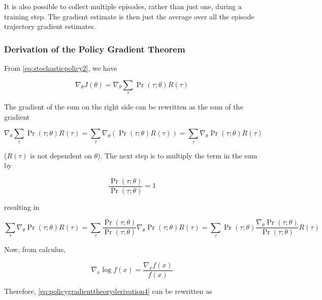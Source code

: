 \documentclass[acmlarge,screen]{acmart}
\begin{document}
It is also possible to collect multiple episodes, rather than just one, during a training step.
The gradient estimate is then just the average over all the episode trajectory gradient estimates.

\subsubsection{Derivation of the Policy Gradient Theorem}

From \ref{eq:stochasticpolicy2}, we have

\begin{equation}
  \nabla_\theta J(\theta) = \nabla_\theta \sum_{\tau} \Pr (\tau; \theta) R(\tau)
\label{eq:policygradienttheoryderivation1}
\end{equation}

\noindent The gradient of the sum on the right side can be rewritten as the sum of the gradient

\begin{equation}
  \nabla_\theta \sum_{\tau} \Pr (\tau; \theta) R(\tau) = \sum_{\tau} \nabla_\theta \left( \Pr (\tau; \theta) R(\tau) \right) = \sum_{\tau} \nabla_\theta \Pr (\tau; \theta) R(\tau)
\label{eq:policygradienttheoryderivation2}
\end{equation}

\noindent ($R(\tau)$ is not dependent on $\theta$).
The next step is to multiply the term in the sum by

\begin{equation}
  \frac{\Pr (\tau; \theta)}{\Pr (\tau; \theta)} = 1
\label{eq:policygradienttheoryderivation3}
\end{equation}

\noindent resulting in

\begin{equation}
  \sum_{\tau} \nabla_\theta \Pr (\tau; \theta) R(\tau) = \sum_{\tau} \frac{\Pr (\tau; \theta)}{\Pr (\tau; \theta)} \nabla_\theta \Pr (\tau; \theta) R(\tau) = \sum_{\tau} \Pr (\tau; \theta) \frac{\nabla_\theta \Pr (\tau; \theta)}{\Pr (\tau; \theta)} R(\tau)
\label{eq:policygradienttheoryderivation4}
\end{equation}

\noindent Now, from calculus,

\begin{equation}
  \nabla_x \log f(x) = \frac{\nabla_x f(x)}{f(x)}
\label{eq:policygradienttheoryderivation5}
\end{equation}

\noindent Therefore, \ref{eq:policygradienttheoryderivation4} can be rewritten as
\end{document}
